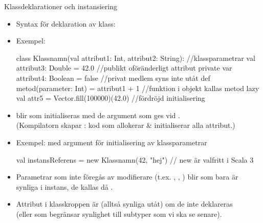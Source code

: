 \begin{Slide}{Klassdeklarationer och instansiering}\SlideFontTiny
\setlength{\leftmargini}{0pt}
\begin{itemize}
\item Syntax för deklaration av klass: \\ \vspace{0.5em}
\item Exempel: 
\begin{Code}
class Klassnamn(val attribut1: Int, attribut2: String):  //klassparametrar
  val attribut3: Double = 42.0              //publikt oföränderligt attribut
  private var attribut4: Boolean = false    //privat medlem syns inte utåt
  def metod(parameter: Int) = attribut1 + 1 //funktion i objekt kallas metod
  lazy val attr5 = Vector.fill(100000)(42.0)     //fördröjd initialisering
\end{Code}

\item {} blir  som initialiseras med de argument som ges vid . 
\\(Kompilatorn skapar : kod som allokerar \& initialiserar alla attribut.)
\item Exempel:  med argument för initialisering av klassparametrar
\begin{Code}
val instansReferens = new Klassnamn(42, "hej")  // new är valfritt i Scala 3 
\end{Code}

\item Parametrar som inte föregås av modifierare (t.ex. , , ) blir  som bara är synliga i  instans,  de kallas då .
\item Attribut i klasskroppen är  (alltså synliga utåt) om de inte deklareras \\(eller  som begränsar synlighet till subtyper som vi ska se senare).
\end{itemize}
\end{Slide}




